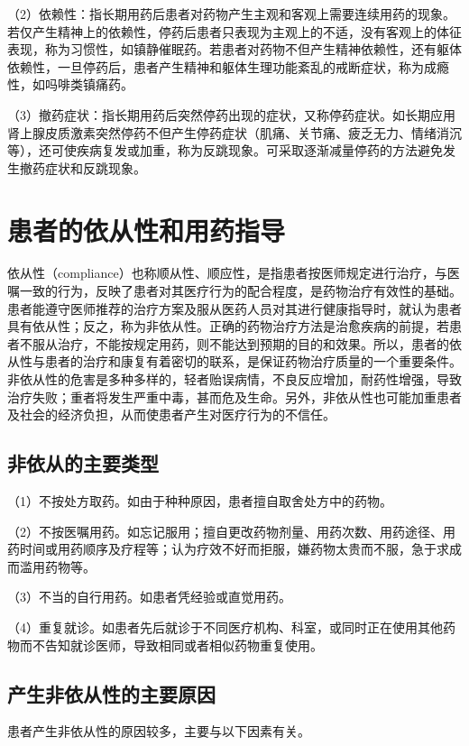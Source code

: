 （2）依赖性：指长期用药后患者对药物产生主观和客观上需要连续用药的现象。若仅产生精神上的依赖性，停药后患者只表现为主观上的不适，没有客观上的体征表现，称为习惯性，如镇静催眠药。若患者对药物不但产生精神依赖性，还有躯体依赖性，一旦停药后，患者产生精神和躯体生理功能紊乱的戒断症状，称为成瘾性，如吗啡类镇痛药。

（3）撤药症状：指长期用药后突然停药出现的症状，又称停药症状。如长期应用肾上腺皮质激素突然停药不但产生停药症状（肌痛、关节痛、疲乏无力、情绪消沉等），还可使疾病复发或加重，称为反跳现象。可采取逐渐减量停药的方法避免发生撤药症状和反跳现象。

\section{患者的依从性和用药指导}

依从性（compliance）也称顺从性、顺应性，是指患者按医师规定进行治疗，与医嘱一致的行为，反映了患者对其医疗行为的配合程度，是药物治疗有效性的基础。患者能遵守医师推荐的治疗方案及服从医药人员对其进行健康指导时，就认为患者具有依从性；反之，称为非依从性。正确的药物治疗方法是治愈疾病的前提，若患者不服从治疗，不能按规定用药，则不能达到预期的目的和效果。所以，患者的依从性与患者的治疗和康复有着密切的联系，是保证药物治疗质量的一个重要条件。非依从性的危害是多种多样的，轻者贻误病情，不良反应增加，耐药性增强，导致治疗失败；重者将发生严重中毒，甚而危及生命。另外，非依从性也可能加重患者及社会的经济负担，从而使患者产生对医疗行为的不信任。

\subsection{非依从的主要类型}

（1）不按处方取药。如由于种种原因，患者擅自取舍处方中的药物。

（2）不按医嘱用药。如忘记服用；擅自更改药物剂量、用药次数、用药途径、用药时间或用药顺序及疗程等；认为疗效不好而拒服，嫌药物太贵而不服，急于求成而滥用药物等。

（3）不当的自行用药。如患者凭经验或直觉用药。

（4）重复就诊。如患者先后就诊于不同医疗机构、科室，或同时正在使用其他药物而不告知就诊医师，导致相同或者相似药物重复使用。

\subsection{产生非依从性的主要原因}

患者产生非依从性的原因较多，主要与以下因素有关。

